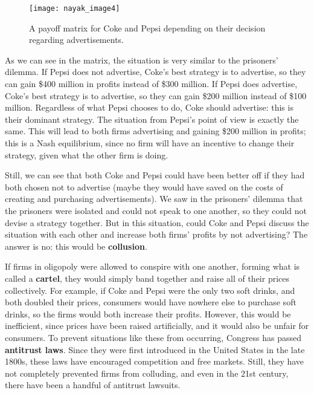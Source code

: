 \begin{figure}[htp]
    \centering
    \begin{minipage}{9cm}
    \texttt{[image: nayak\_image4]}
    \caption{A payoff matrix for Coke and Pepsi depending on their decision regarding advertisements.}
    \label{fig:2}
    \end{minipage}
\end{figure}

\pagebreak
As we can see in the matrix, the situation is very similar to the prisoners’ dilemma. If Pepsi does not advertise, Coke’s best strategy is to advertise, so they can gain \$400 million in profits instead of \$300 million. If Pepsi does advertise, Coke’s best strategy is to advertise, so they can gain \$200 million instead of \$100 million. Regardless of what Pepsi chooses to do, Coke should advertise: this is their dominant strategy. The situation from Pepsi’s point of view is exactly the same. This will lead to both firms advertising and gaining \$200 million in profits; this is a Nash equilibrium, since no firm will have an incentive to change their strategy, given what the other firm is doing.

Still, we can see that both Coke and Pepsi could have been better off if they had both chosen not to advertise (maybe they would have saved on the costs of creating and purchasing advertisements). We saw in the prisoners’ dilemma that the prisoners were isolated and could not speak to one another, so they could not devise a strategy together. But in this situation, could Coke and Pepsi discuss the situation with each other and increase both firms’ profits by not advertising? The answer is no: this would be \textbf{collusion}.

If firms in oligopoly were allowed to conspire with one another, forming what is called a \textbf{cartel}, they would simply band together and raise all of their prices collectively. For example, if Coke and Pepsi were the only two soft drinks, and both doubled their prices, consumers would have nowhere else to purchase soft drinks, so the firms would both increase their profits. However, this would be inefficient, since prices have been raised artificially, and it would also be unfair for consumers. To prevent situations like these from occurring, Congress has passed \textbf{antitrust laws}. Since they were first introduced in the United States in the late 1800s, these laws have encouraged competition and free markets. Still, they have not completely prevented firms from colluding, and even in the 21st century, there have been a handful of antitrust lawsuits.

